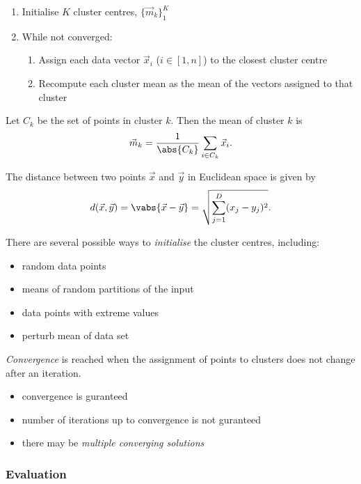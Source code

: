\documentclass{article}
\begin{document}
\begin{enumerate}
	\item Initialise $K$ cluster centres, $\{\vec m_k\}^K_1$
	\item While not converged: \begin{enumerate}
		      \item Assign each data vector $\vec x_i$ ($i\in[1,n]$) to the closest cluster centre
		      \item Recompute each cluster mean as the mean of the vectors assigned to that cluster
	      \end{enumerate}
\end{enumerate}
\begin{theorem}
	Let $C_k$ be the set of points in cluster $k$. Then the mean of cluster $k$
	is
	\begin{align*}
		\vec m_k=\frac{1}{\abs{C_k}}\sum_{i\in C_k}\vec x_i.
	\end{align*}
\end{theorem}
\begin{definition}
	The distance between two points $\vec x$ and $\vec y$ in Euclidean space
	is given by
	\begin{align*}
		d(\vec x, \vec y) = \vabs{\vec x - \vec y}=\sqrt{\sum_{j=1}^D(x_j-y_j)^2}.
	\end{align*}
\end{definition}
There are several possible ways to \emph{initialise} the cluster centres, including:
\begin{itemize}
	\item random data points
	\item means of random partitions of the input
	\item data points with extreme values
	\item perturb mean of data set
\end{itemize}
\begin{definition}
	\emph{Convergence} is reached when the assignment of points to clusters
	does not change after an iteration.
	\begin{itemize}
		\item convergence is guranteed
		\item number of iterations up to convergence is not guranteed
		\item there may be \emph{multiple converging solutions}
	\end{itemize}
\end{definition}

\subsubsection{Evaluation}
\end{document}
